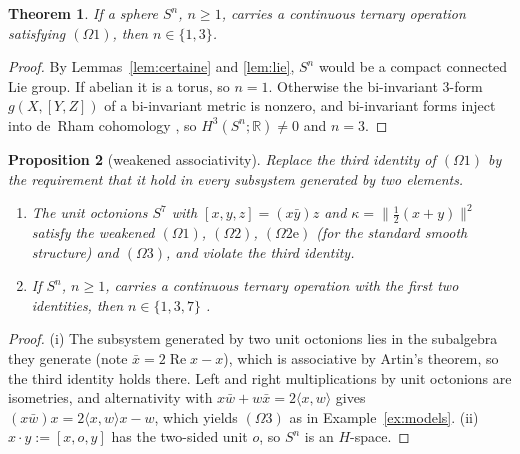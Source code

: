 \documentclass[11pt,reqno]{amsart}
\newtheorem{theorem}{Theorem}[section]
\newtheorem{proposition}[theorem]{Proposition}
\theoremstyle{definition}
\theoremstyle{remark}
\numberwithin{equation}{section}
\newcommand{\R}{\mathbb{R}}
\newcommand{\re}{\operatorname{Re}}
\newcommand{\ip}[2]{\langle #1,#2\rangle}
\newcommand{\hp}[3]{[#1,#2,#3]}
\begin{document}
\begin{theorem}\label{thm:obstruction}
If a sphere $S^n$, $n\ge1$, carries a continuous ternary operation satisfying $(\Omega1)$, then
$n\in\{1,3\}$.
\end{theorem}
\begin{proof}
By Lemmas~\ref{lem:certaine} and \ref{lem:lie}, $S^n$ would be a compact connected Lie group.  If abelian it
is a torus, so $n=1$.  Otherwise the bi-invariant $3$-form $g(X,[Y,Z])$ of a bi-invariant metric is nonzero,
and bi-invariant forms inject into de~Rham cohomology \cite{CE}, so $H^3(S^n;\R)\ne0$ and $n=3$.
\end{proof}

\begin{proposition}[weakened associativity]\label{prop:moufang}
Replace the third identity of $(\Omega1)$ by the requirement that it hold in every subsystem generated by
two elements.
\begin{enumerate}[label=(\roman*)]
\item The unit octonions $S^7$ with $\hp xyz=(x\bar y)z$ and $\kappa=\lVert\tfrac12(x+y)\rVert^2$ satisfy the
weakened $(\Omega1)$, $(\Omega2)$, $(\Omega2\mathrm e)$ (for the standard smooth structure) and $(\Omega3)$, and violate
the third identity.
\item If $S^n$, $n\ge1$, carries a continuous ternary operation with the first two identities, then
$n\in\{1,3,7\}$ \cite{Adams}.
\end{enumerate}
\end{proposition}
\begin{proof}
(i) The subsystem generated by two unit octonions lies in the subalgebra they generate (note $\bar x=2\re x-x$), which is
associative by Artin's theorem, so the third identity holds there.  Left and right multiplications by unit octonions are
isometries, and alternativity with $x\bar w+w\bar x=2\ip xw$ gives $(x\bar w)x=2\ip xwx-w$, which yields $(\Omega3)$ as in
Example~\ref{ex:models}.  (ii) $x\cdot y:=\hp xoy$ has the two-sided unit $o$, so $S^n$ is an $H$-space.
\end{proof}
\end{document}
